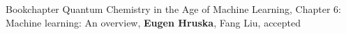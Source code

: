 \begin{rubric}{Bookchapter}
\entry*[\hspace{1.05cm}2022] Quantum Chemistry in the Age of Machine Learning, Chapter 6: Machine learning: An overview, \textbf{Eugen Hruska}, Fang Liu, accepted
\end{rubric}